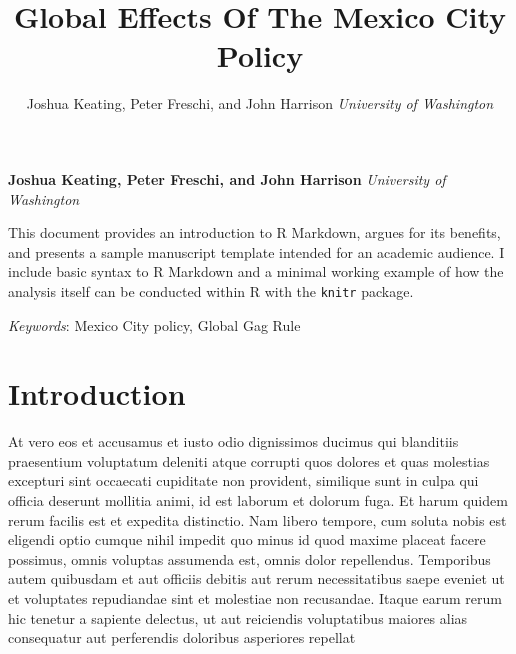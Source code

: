 \documentclass[11pt,]{article}
\title{Global Effects Of The Mexico City Policy  }
\author{\Large Joshua Keating, Peter Freschi, and John Harrison\vspace{0.05in} \newline\normalsize\emph{University of Washington}  }
\date{}
\newcommand*{\authorfont}{\fontfamily{phv}\selectfont}
\renewenvironment{abstract}
 {{%
    \setlength{\leftmargin}{0mm}
    \setlength{\rightmargin}{\leftmargin}%
  }%
  \relax}
 {\endlist}
\begin{document}
	
%

{%
\setlength{\parindent}{0pt}
\thispagestyle{plain}
{\fontsize{18}{20}\selectfont\raggedright 
\maketitle  %

}

{
   \vskip 13.5pt\relax \normalsize\fontsize{11}{12} 
\textbf{\authorfont Joshua Keating, Peter Freschi, and John Harrison} \hskip 15pt \emph{\small University of Washington}   

}

}







\begin{abstract}

    \hbox{\vrule height .2pt width 39.14pc}

    \vskip 8.5pt %

\noindent This document provides an introduction to R Markdown, argues for its
benefits, and presents a sample manuscript template intended for an
academic audience. I include basic syntax to R Markdown and a minimal
working example of how the analysis itself can be conducted within R
with the \texttt{knitr} package.


\vskip 8.5pt \noindent \emph{Keywords}: Mexico City policy, Global Gag Rule \par

    \hbox{\vrule height .2pt width 39.14pc}



\end{abstract}


\vskip 6.5pt

\noindent  \section{Introduction}\label{introduction}

At vero eos et accusamus et iusto odio dignissimos ducimus qui
blanditiis praesentium voluptatum deleniti atque corrupti quos dolores
et quas molestias excepturi sint occaecati cupiditate non provident,
similique sunt in culpa qui officia deserunt mollitia animi, id est
laborum et dolorum fuga. Et harum quidem rerum facilis est et expedita
distinctio. Nam libero tempore, cum soluta nobis est eligendi optio
cumque nihil impedit quo minus id quod maxime placeat facere possimus,
omnis voluptas assumenda est, omnis dolor repellendus. Temporibus autem
quibusdam et aut officiis debitis aut rerum necessitatibus saepe eveniet
ut et voluptates repudiandae sint et molestiae non recusandae. Itaque
earum rerum hic tenetur a sapiente delectus, ut aut reiciendis
voluptatibus maiores alias consequatur aut perferendis doloribus
asperiores repellat
\end{document}

